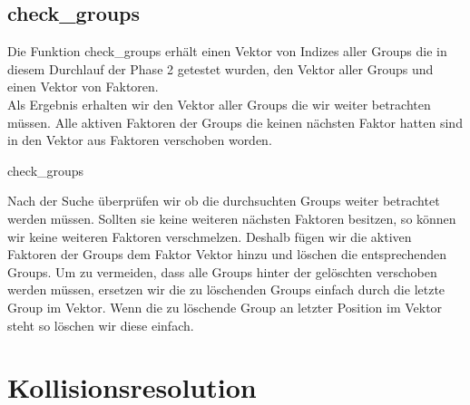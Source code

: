 \subsection{check\_groups}
Die Funktion check\_groups erhält einen Vektor von Indizes aller Groups die in diesem Durchlauf der Phase 2 getestet wurden, den Vektor aller Groups und einen Vektor von Faktoren.\\
Als Ergebnis erhalten wir den Vektor aller Groups die wir weiter betrachten müssen. Alle aktiven Faktoren der Groups die keinen nächsten Faktor hatten sind in den Vektor aus Faktoren verschoben worden.\\
\begin{algorithm}[ht!]
	\caption{check\_groups}
	
	
\end{algorithm}

\noindent
Nach der Suche überprüfen wir ob die durchsuchten Groups weiter betrachtet werden müssen. Sollten sie keine weiteren nächsten Faktoren besitzen, so können wir keine weiteren Faktoren verschmelzen. Deshalb fügen wir die aktiven Faktoren der Groups dem Faktor Vektor hinzu und löschen die entsprechenden Groups. Um zu vermeiden, dass alle Groups hinter der gelöschten verschoben werden müssen,  ersetzen wir die zu löschenden Groups einfach durch die letzte Group im Vektor. Wenn die zu löschende Group an letzter Position im Vektor steht  so löschen wir diese einfach.
\newpage

\section{Kollisionsresolution}

